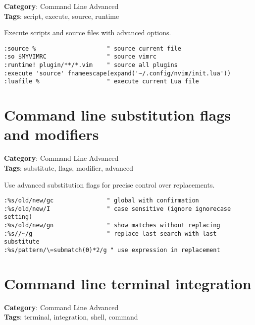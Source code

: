 {{{\textbf{Category}: Command Line Advanced\\ \textbf{Tags}: script, execute, source, runtime
\vspace{0.5cm}

Execute scripts and source files with advanced options.

\begin{Exa*}{}
\begin{Verbatim}[fontsize=\footnotesize, breaklines, breakanywhere]
:source %                    " source current file
:so $MYVIMRC                 " source vimrc
:runtime! plugin/**/*.vim    " source all plugins
:execute 'source' fnameescape(expand('~/.config/nvim/init.lua'))
:luafile %                   " execute current Lua file
\end{Verbatim}
\end{Exa*}

\section{Command line substitution flags and modifiers}

\textbf{Category}: Command Line Advanced\\ \textbf{Tags}: substitute, flags, modifier, advanced
\vspace{0.5cm}

Use advanced substitution flags for precise control over replacements.

\begin{Exa*}{}
\begin{Verbatim}[fontsize=\footnotesize, breaklines, breakanywhere]
:%s/old/new/gc               " global with confirmation
:%s/old/new/I                " case sensitive (ignore ignorecase setting)  
:%s/old/new/gn               " show matches without replacing
:%s//~/g                     " replace last search with last substitute
:%s/pattern/\=submatch(0)*2/g " use expression in replacement
\end{Verbatim}
\end{Exa*}

\section{Command line terminal integration}

\textbf{Category}: Command Line Advanced\\ \textbf{Tags}: terminal, integration, shell, command
\vspace{0.5cm}

}}}
